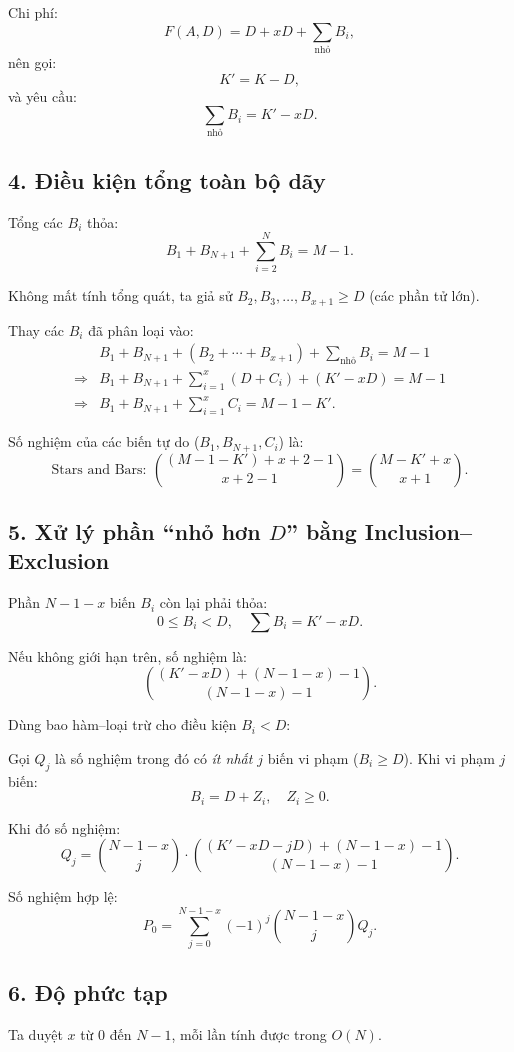 Chi phí:
\[
F(A,D) = D + xD + \sum_{\text{nhỏ}} B_i,
\]
nên gọi:
\[
K' = K - D,
\]
và yêu cầu:
\[
\sum_{\text{nhỏ}} B_i = K' - xD.
\]

\subsection*{4. Điều kiện tổng toàn bộ dãy}

Tổng các $B_i$ thỏa:
\[
B_1 + B_{N+1} + \sum_{i=2}^N B_i = M-1.
\]

Không mất tính tổng quát, ta giả sử $B_2,B_3,\ldots,B_{x+1} \ge D$ (các phần tử lớn).

Thay các $B_i$ đã phân loại vào:
\begin{align}
    &B_1 + B_{N+1} + (B_2 + \cdots + B_{x+1}) + \sum_{\text{nhỏ}} B_i = M-1 \\
    \Rightarrow &B_1 + B_{N+1} + \sum_{i=1}^x (D + C_i) + (K' - xD) = M-1 \\
    \Rightarrow &B_1 + B_{N+1} + \sum_{i=1}^x C_i = M - 1 - K'.
\end{align}

Số nghiệm của các biến tự do ($B_1, B_{N+1}, C_i$) là:
\[
\text{Stars and Bars}:\
\binom{(M-1-K') + x+2-1}{x+2-1}=\binom{M - K' + x}{x+1}.
\]

\subsection*{5. Xử lý phần ``nhỏ hơn $D$'' bằng Inclusion--Exclusion}

Phần $N-1-x$ biến $B_i$ còn lại phải thỏa:
\[
0 \le B_i < D,\quad \sum B_i = K' - xD.
\]

Nếu không giới hạn trên, số nghiệm là:
\[
\binom{(K' - xD) + (N-1-x) - 1}{(N-1-x)-1}.
\]

Dùng bao hàm--loại trừ cho điều kiện $B_i < D$:

Gọi $Q_j$ là số nghiệm trong đó có \emph{ít nhất $j$} biến vi phạm ($B_i \ge D$).  
Khi vi phạm $j$ biến:
\[
B_i = D + Z_i,\quad Z_i \ge 0.
\]

Khi đó số nghiệm:
\[
Q_j = \binom{N-1-x}{j}
      \cdot
      \binom{(K' - xD - jD) + (N-1-x)-1}{(N-1-x)-1}.
\]

Số nghiệm hợp lệ:
\[
P_0 = \sum_{j=0}^{N-1-x} (-1)^j 
\binom{N-1-x}{j} Q_j.
\]

\subsection*{6. Độ phức tạp}
Ta duyệt $x$ từ $0$ đến $N-1$, mỗi lần tính được trong $O(N)$.

